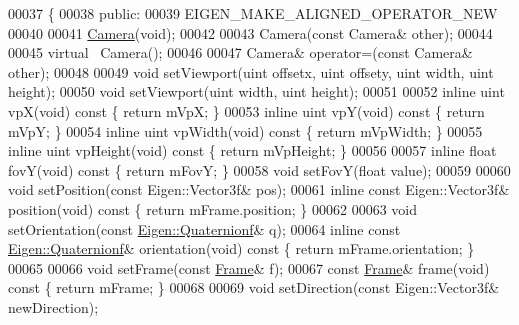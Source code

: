 \begin{DoxyCode}
00037 \{
00038   \textcolor{keyword}{public}:
00039     EIGEN\_MAKE\_ALIGNED\_OPERATOR\_NEW
00040 
00041     \hyperlink{class_camera}{Camera}(\textcolor{keywordtype}{void});
00042     
00043     Camera(\textcolor{keyword}{const} Camera& other);
00044     
00045     \textcolor{keyword}{virtual} ~Camera();
00046     
00047     Camera& operator=(\textcolor{keyword}{const} Camera& other);
00048     
00049     \textcolor{keywordtype}{void} setViewport(uint offsetx, uint offsety, uint width, uint height);
00050     \textcolor{keywordtype}{void} setViewport(uint width, uint height);
00051     
00052     \textcolor{keyword}{inline} uint vpX(\textcolor{keywordtype}{void})\textcolor{keyword}{ const }\{ \textcolor{keywordflow}{return} mVpX; \}
00053     \textcolor{keyword}{inline} uint vpY(\textcolor{keywordtype}{void})\textcolor{keyword}{ const }\{ \textcolor{keywordflow}{return} mVpY; \}
00054     \textcolor{keyword}{inline} uint vpWidth(\textcolor{keywordtype}{void})\textcolor{keyword}{ const }\{ \textcolor{keywordflow}{return} mVpWidth; \}
00055     \textcolor{keyword}{inline} uint vpHeight(\textcolor{keywordtype}{void})\textcolor{keyword}{ const }\{ \textcolor{keywordflow}{return} mVpHeight; \}
00056 
00057     \textcolor{keyword}{inline} \textcolor{keywordtype}{float} fovY(\textcolor{keywordtype}{void})\textcolor{keyword}{ const }\{ \textcolor{keywordflow}{return} mFovY; \}
00058     \textcolor{keywordtype}{void} setFovY(\textcolor{keywordtype}{float} value);
00059     
00060     \textcolor{keywordtype}{void} setPosition(\textcolor{keyword}{const} Eigen::Vector3f& pos);
00061     \textcolor{keyword}{inline} \textcolor{keyword}{const} Eigen::Vector3f& position(\textcolor{keywordtype}{void})\textcolor{keyword}{ const }\{ \textcolor{keywordflow}{return} mFrame.position; \}
00062 
00063     \textcolor{keywordtype}{void} setOrientation(\textcolor{keyword}{const} \hyperlink{group___geometry___module_class_eigen_1_1_quaternion}{Eigen::Quaternionf}& q);
00064     \textcolor{keyword}{inline} \textcolor{keyword}{const} \hyperlink{group___geometry___module_class_eigen_1_1_quaternion}{Eigen::Quaternionf}& orientation(\textcolor{keywordtype}{void})\textcolor{keyword}{ const }\{ \textcolor{keywordflow}{return} mFrame.orientation;
       \}
00065 
00066     \textcolor{keywordtype}{void} setFrame(\textcolor{keyword}{const} \hyperlink{class_frame}{Frame}& f);
00067     \textcolor{keyword}{const} \hyperlink{class_frame}{Frame}& frame(\textcolor{keywordtype}{void})\textcolor{keyword}{ const }\{ \textcolor{keywordflow}{return} mFrame; \}
00068     
00069     \textcolor{keywordtype}{void} setDirection(\textcolor{keyword}{const} Eigen::Vector3f& newDirection);

\end{DoxyCode}
